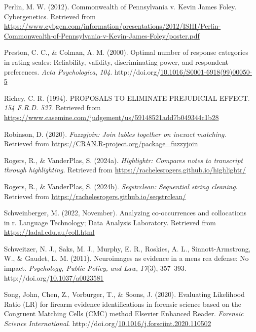 \documentclass[print]{nuthesis}
\newlength{\cslhangindent}
\newenvironment{CSLReferences}[2]%
{\setlength{\parindent}{0pt}%
\everypar{\setlength{\hangindent}{\cslhangindent}}\ignorespaces}%
{\par}
\begin{document}
\begin{CSLReferences}{1}{0}
\leavevmode{}%
Perlin, M. W. (2012). Commonwealth of {Pennsylvania} v. {Kevin James Foley}. Cybergenetics. Retrieved from \url{https://www.cybgen.com/information/presentations/2012/ISHI/Perlin-Commonwealth-of-Pennsylvania-v-Kevin-James-Foley/poster.pdf}

\leavevmode{}%
Preston, C. C., \& Colman, A. M. (2000). Optimal number of response categories in rating scales: Reliability, validity, discriminating power, and respondent preferences. \emph{Acta Psychologica}, \emph{104}. http://doi.org/\href{https://doi.org/10.1016/S0001-6918(99)00050-5}{10.1016/S0001-6918(99)00050-5}

\leavevmode{}%
Richey, C. R. (1994). PROPOSALS TO ELIMINATE PREJUDICIAL EFFECT. \emph{154 {F}.{R}.{D}. 537}. Retrieved from \url{https://www.casemine.com/judgement/us/59148521add7b049344c1b28}

\leavevmode{}%
Robinson, D. (2020). \emph{Fuzzyjoin: Join tables together on inexact matching}. Retrieved from \url{https://CRAN.R-project.org/package=fuzzyjoin}

\leavevmode{}%
Rogers, R., \& VanderPlas, S. (2024a). \emph{Highlightr: Compares notes to transcript through highlighting}. Retrieved from \url{https://rachelesrogers.github.io/highlightr/}

\leavevmode{}%
Rogers, R., \& VanderPlas, S. (2024b). \emph{Seqstrclean: Sequential string cleaning}. Retrieved from \url{https://rachelesrogers.github.io/seqstrclean/}

\leavevmode{}%
Schweinberger, M. (2022, November). Analyzing co-occurrences and collocations in r. Language Technology; Data Analysis Laboratory. Retrieved from \url{https://ladal.edu.au/coll.html}

\leavevmode{}%
Schweitzer, N. J., Saks, M. J., Murphy, E. R., Roskies, A. L., Sinnott-Armstrong, W., \& Gaudet, L. M. (2011). Neuroimages as evidence in a mens rea defense: {No} impact. \emph{Psychology, Public Policy, and Law}, \emph{17}(3), 357--393. http://doi.org/\href{https://doi.org/10.1037/a0023581}{10.1037/a0023581}

\leavevmode{}%
Song, John, Chen, Z., Vorburger, T., \& Soons, J. (2020). Evaluating {Likelihood} {Ratio} ({LR}) for firearm evidence identifications in forensic science based on the {Congruent} {Matching} {Cells} ({CMC}) method {\textbar} {Elsevier} {Enhanced} {Reader}. \emph{Forensic Science International}. http://doi.org/\href{https://doi.org/10.1016/j.forsciint.2020.110502}{10.1016/j.forsciint.2020.110502}


\end{CSLReferences}
\end{document}
